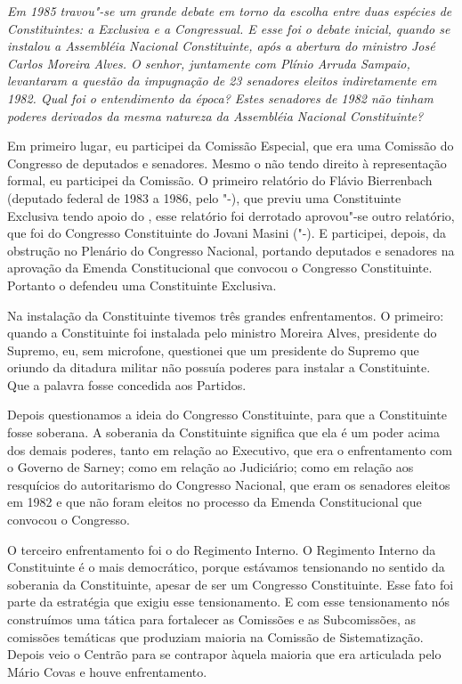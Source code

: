 \medskip

\noindent\emph{Em 1985 travou"-se um grande debate em torno da escolha entre
duas espécies de Constituintes: a Exclusiva e a Congressual. E esse foi
o debate inicial, quando se instalou a Assembléia Nacional Constituinte,
após a abertura do ministro José Carlos Moreira Alves. O senhor,
juntamente com Plínio Arruda Sampaio, levantaram a questão da impugnação
de 23 senadores eleitos indiretamente em 1982. Qual foi o entendimento
da época? Estes senadores de 1982 não tinham poderes derivados da mesma
natureza da Assembléia Nacional Constituinte?}

Em primeiro lugar, eu participei da Comissão Especial,
que era uma Comissão do Congresso de deputados e senadores. Mesmo o 
não tendo direito à representação formal, eu participei da Comissão. O
primeiro relatório do Flávio Bierrenbach (deputado federal de 1983 a
1986, pelo "-), que previu uma Constituinte Exclusiva tendo apoio
do , esse relatório foi derrotado aprovou"-se outro relatório, que foi
do Congresso Constituinte do Jovani Masini ("-). E participei,
depois, da obstrução no Plenário do Congresso Nacional, portando
deputados e senadores na aprovação da Emenda Constitucional que convocou
o Congresso Constituinte. Portanto o  defendeu uma Constituinte
Exclusiva.

Na instalação da Constituinte tivemos três grandes enfrentamentos. O
primeiro: quando a Constituinte foi instalada pelo ministro Moreira
Alves, presidente do Supremo, eu, sem microfone, questionei que um
presidente do Supremo que oriundo da ditadura militar não possuía
poderes para instalar a Constituinte. Que a palavra fosse concedida aos
Partidos.

Depois questionamos a ideia do Congresso Constituinte, para que a
Constituinte fosse soberana. A soberania da Constituinte significa que
ela é um poder acima dos demais poderes, tanto em relação ao Executivo,
que era o enfrentamento com o Governo de Sarney; como em relação ao
Judiciário; como em relação aos resquícios do autoritarismo do Congresso
Nacional, que eram os senadores eleitos em 1982 e que não foram eleitos
no processo da Emenda Constitucional que convocou o Congresso.

O terceiro enfrentamento foi o do Regimento Interno. O Regimento Interno
da Constituinte é o mais democrático, porque estávamos tensionando no
sentido da soberania da Constituinte, apesar de ser um Congresso
Constituinte. Esse fato foi parte da estratégia que exigiu esse
tensionamento. E com esse tensionamento nós construímos uma tática para
fortalecer as Comissões e as Subcomissões, as comissões temáticas que
produziam maioria na Comissão de Sistematização. Depois veio o Centrão
para se contrapor àquela maioria que era articulada pelo Mário Covas e
houve enfrentamento.


